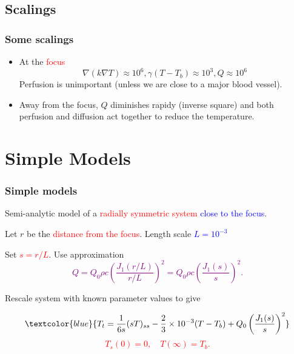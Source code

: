 \documentclass{beamer}
\begin{document}
\subsection{Scalings}
\begin{frame} 
\frametitle{Some scalings}

\begin{itemize}

\item At the \textcolor{red}{ focus} 
$$\nabla (k \nabla T) \approx 10^6,  \gamma (T- T_b) \approx 10^3, Q \approx 10^6$$
Perfusion is unimportant (unless we are close to a major blood vessel).

\item Away from the focus, $Q$ diminishes rapidy (inverse square) and both perfusion and diffusion act together to reduce the temperature.

\end{itemize}


\end{frame}

\section{Simple Models}
\begin{frame}
\frametitle{Simple models}
Semi-analytic model of a \textcolor{red}{radially symmetric system}  \textcolor{blue}{close to the focus}.  

Let $r$ be the \textcolor{red}{distance from the focus}. Length scale \textcolor{blue}{$L = 10^{-3}$}

Set \textcolor{red}{$s = r/L$}. Use approximation
\textcolor{purple}
{
$$Q = Q_0 \rho c \left( \frac{J_1(r/L)}{r/L} \right)^2 = Q_0 \rho c \left( \frac{J_1(s)}{s} \right)^2.$$
}

Rescale system with known parameter values to give

$$\textcolor{blue}{T_t = \frac{1}{6s}  (s T)_{ss} - \frac{2}{3} \times 10^{-3} (T-T_b) + Q_0 \left( \frac{J_1(s)}{s} \right)^2} $$
\textcolor{red}{$$T_s(0) = 0, \quad T(\infty) = T_b.$$}
\end{frame}
\end{document}
